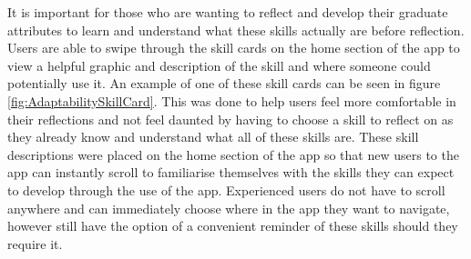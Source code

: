 \documentclass{l4proj}
\begin{document}
It is important for those who are wanting to reflect and develop their graduate attributes to learn and understand what these skills actually are before reflection. Users are able to swipe through the skill cards on the home section of the app to view a helpful graphic and description of the skill and where someone could potentially use it. An example of one of these skill cards can be seen in figure \ref{fig:AdaptabilitySkillCard}. This was done to help users feel more comfortable in their reflections and not feel daunted by having to choose a skill to reflect on as they already know and understand what all of these skills are. These skill descriptions were placed on the home section of the app so that new users to the app can instantly scroll to familiarise themselves with the skills they can expect to develop through the use of the app. Experienced users do not have to scroll anywhere and can immediately choose where in the app they want to navigate, however still have the option of a convenient reminder of these skills should they require it. 
\end{document}
